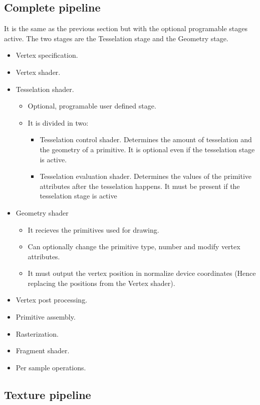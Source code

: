 \subsection{Complete pipeline}
\label{sec:compPipe}

It is the same as the previous section but with the optional programable stages active.
The two stages are the Tesselation stage and the Geometry stage.

\begin{itemize}
 \item Vertex specification.
 \item Vertex shader.
 \item Tesselation shader.
 \begin{itemize}
  \item Optional, programable user defined stage.
  \item It is divided in two:
  \begin{itemize}
   \item Tesselation control shader. Determines the amount of tesselation and the geometry of a primitive. It is optional even if the tesselation stage is active.
   \item Tesselation evaluation shader. Determines the values of the primitive attributes after the tesselation happens. It must be present if the tesselation stage is active
  \end{itemize}
 \end{itemize}
 \item Geometry shader
 \begin{itemize}
  \item It recieves the primitives used for drawing.
  \item Can optionally change the primitive type, number and modify vertex attributes.
  \item It must output the vertex position in normalize device coordinates (Hence replacing the positions from the Vertex shader).
 \end{itemize}
 \item Vertex post processing.
 \item Primitive assembly.
 \item Rasterization.
 \item Fragment shader.
 \item Per sample operations.
\end{itemize}

\subsection{Texture pipeline}
\label{sec:textPipe}